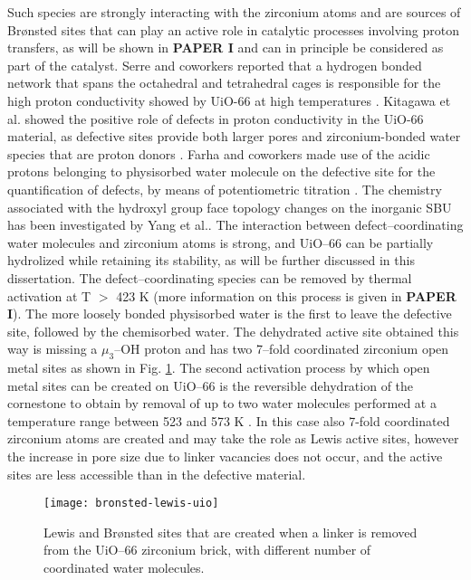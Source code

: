Such species are strongly interacting with the zirconium atoms and are sources of Br\o{}nsted sites that can play an active role in catalytic processes involving proton transfers, as will be shown in \textbf{PAPER I} and can in principle be considered as part of the catalyst. Serre and coworkers reported that a hydrogen bonded network that spans the octahedral and tetrahedral cages is responsible for the high proton conductivity showed by UiO-66 at high temperatures \cite{borges2016proton}. Kitagawa et al. showed the positive role of defects in proton conductivity in the UiO-66 material, as defective sites provide both larger pores and zirconium-bonded water species that are proton donors \cite{taylor2015defect}. Farha and coworkers made use of the acidic protons belonging to physisorbed water molecule on the defective site for the quantification of defects, by means of potentiometric titration \cite{klet2016evaluation}. The chemistry associated with the hydroxyl group face topology changes on the inorganic SBU has been investigated by Yang et al.\cite{yang2016tuning}. The interaction between defect--coordinating water molecules and zirconium atoms is strong, and UiO--66 can be partially hydrolized\cite{decoste2013stability} while retaining its stability, as will be further discussed in this dissertation.
\npar
The defect--coordinating species can be removed by thermal activation at T $>$ 423 K (more information on this process is given in \textbf{PAPER I}). The more loosely bonded physisorbed water is the first to leave the defective site, followed by the chemisorbed water. The dehydrated active site obtained this way is missing a $\mu_{3}$--OH proton and has two 7--fold coordinated zirconium open metal sites as shown in Fig. \ref{fig:bronsted-lewis-uio}. 
\npar
The second activation process by which open metal sites can be created on UiO--66 is the reversible dehydration of the  cornestone to obtain  by removal of up to two water molecules performed at a temperature range between 523 and 573 K \cite{valenzano2011disclosing}. In this case also 7-fold coordinated zirconium atoms are created and may take the role as Lewis active sites, however the increase in pore size due to linker vacancies does not occur, and the active sites are less accessible than in the defective material. 
\begin{figure}[!htbp]
	\centering
 	\texttt{[image: bronsted-lewis-uio]}
	\caption{Lewis and Br\o{}nsted sites that are created when a linker is removed from the UiO--66 zirconium brick, with different number of coordinated water molecules.}
	\label{fig:bronsted-lewis-uio}
\end{figure}
